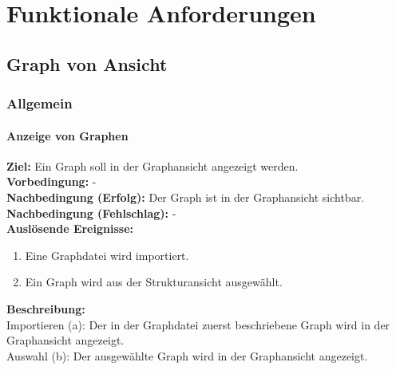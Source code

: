 \chapter{Funktionale Anforderungen}
\label{ch:funktionen}


\setcounter{fanr}{10}
\newcommand{\fano}[1]{\subsubsection{#1}\addtocounter{fanr}{10}}
\newcommand{\subfano}[1]{\subsubsection{#1}\addtocounter{fanr}{1}}
\renewcommand\thesubsubsection{/FA\ifnum\value{fanr}<10 00\else\ifnum\value{fanr}<100 0\fi\fi\arabic{fanr}/}

\section{Graph von Ansicht}

\subsection{Allgemein}

\fano{Anzeige von Graphen}\label{fa:graphen}
\textbf{Ziel:} Ein Graph soll in der Graphansicht angezeigt werden.\\
\textbf{Vorbedingung:} -\\
\textbf{Nachbedingung (Erfolg):} Der Graph ist in der Graphansicht sichtbar.\\
\textbf{Nachbedingung (Fehlschlag):} -\\
\textbf{Auslösende Ereignisse:}
\begin{enumerate}[nolistsep, label=(\alph*)]
  \item Eine Graphdatei wird importiert.
  \item Ein Graph wird aus der Strukturansicht ausgewählt.
\end{enumerate}
\textbf{Beschreibung:}\\
Importieren (a): Der in der Graphdatei zuerst beschriebene Graph wird in der Graphansicht angezeigt.\\
Auswahl (b): Der ausgewählte Graph wird in der Graphansicht angezeigt.


